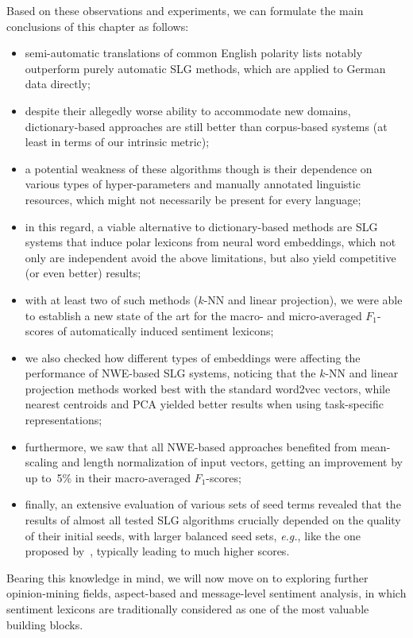 \documentclass[11pt]{article}
\newcommand{\eg}{\textit{e.g.},}
\newcommand{\F}[0]{$F_1$}
\begin{document}
Based on these observations and experiments, we can formulate the main
conclusions of this chapter as follows:
\begin{itemize}
\item semi-automatic translations of common English polarity lists
  notably outperform purely automatic SLG methods, which are applied
  to German data directly;
\item despite their allegedly worse ability to accommodate new
  domains, dictionary-based approaches are still better than
  corpus-based systems (at least in terms of our intrinsic metric);
\item a potential weakness of these algorithms though is their
  dependence on various types of hyper-parameters and manually
  annotated linguistic resources, which might not necessarily be
  present for every language;
\item in this regard, a viable alternative to dictionary-based methods
  are SLG systems that induce polar lexicons from neural word
  embeddings, which not only are independent avoid the above limitations, but
  also yield competitive (or even better) results;
\item with at least two of such methods ($k$-NN and linear
  projection), we were able to establish a new state of the art for
  the macro- and micro-averaged \F-scores of automatically induced
  sentiment lexicons;
\item we also checked how different types of embeddings were affecting
  the performance of NWE-based SLG systems, noticing that the $k$-NN
  and linear projection methods worked best with the standard word2vec
  vectors, while nearest centroids and PCA yielded better results when
  using task-specific representations;
\item furthermore, we saw that all NWE-based approaches benefited from
  mean-scaling and length normalization of input vectors, getting an
  improvement by up to~5\% in their macro-averaged \F-scores;
\item finally, an extensive evaluation of various sets of seed terms
  revealed that the results of almost all tested SLG algorithms
  crucially depended on the quality of their initial seeds, with
  larger balanced seed sets, \eg{} like the one proposed
  by~\citet{Kim:04}, typically leading to much higher scores.
\end{itemize}

Bearing this knowledge in mind, we will now move on to exploring
further opinion-mining fields, aspect-based and message-level
sentiment analysis, in which sentiment lexicons are traditionally
considered as one of the most valuable building blocks.
\end{document}
